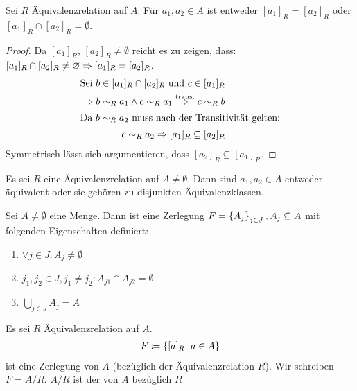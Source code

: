 \begin{lemma}
    Sei $R$ Äquivalenzrelation auf $A$. Für $a_1,a_2\in A$ ist entweder $[a_1]_R = [a_2]_R$ oder $[a_1]_R \cap [a_2]_R = \emptyset$.
    \begin{proof}
        Da $[a_1]_R$, $[a_2]_R \neq \emptyset$ reicht es zu zeigen, dass: $[a_1]_R \cap [a_2]_R \neq \varnothing \Rightarrow{} [a_1]_R = [a_2]_R$.
        \begin{align*}
            \text{Sei }b\in [a_1]_R\cap [a_2]_R\text{ und }c\in [a_1]_R\\
            \Rightarrow{} b\sim_R a_1 \land c\sim_R a_1 \overset{\text{trans.}}{\Rightarrow{}} c\sim_R b\\
            \intertext{Da  $b\sim_R a_2$ muss nach der Transitivität gelten:} c\sim_R a_2 \Rightarrow{} [a_1]_R \subseteq [a_2]_R
        \end{align*}
        Symmetrisch lässt sich argumentieren, dass $[a_2]_R \subseteq [a_1]_R$.
    \end{proof}
\end{lemma}

\begin{korollar}
    Es sei $R$ eine Äquivalenzrelation auf $A\neq \emptyset$. Dann sind $a_1,a_2\in A$ entweder äquivalent oder sie gehören zu disjunkten Äquivalenzklassen.
\end{korollar}

\begin{definition}
    Sei $A\neq \emptyset$ eine Menge. Dann ist eine Zerlegung $F = \left\{A_j\right\}_{j\in J}, A_j\subseteq A$ mit folgenden Eigenschaften definiert:
    \begin{enumerate}
        \item $\forall j\in J\colon A_j\neq \emptyset$
        \item $j_1, j_2\in J, j_1\neq j_2\colon A_{j1} \cap A_{j2} = \emptyset$
        \item $\bigcup_{j\in J}A_j = A$
    \end{enumerate}
\end{definition}

\begin{notation}[Quotient]
    Es sei $R$ Äquivalenzrelation auf $A$.
    \begin{align*}
        F\coloneqq\left\{[a]_R|~a\in A\right\}
    \end{align*}
    ist eine Zerlegung von $A$ (bezüglich der Äquivalenzrelation $R$). Wir schreiben $F = A/R$.
    $A/R$ ist der  von $A$ bezüglich $R$
\end{notation}

